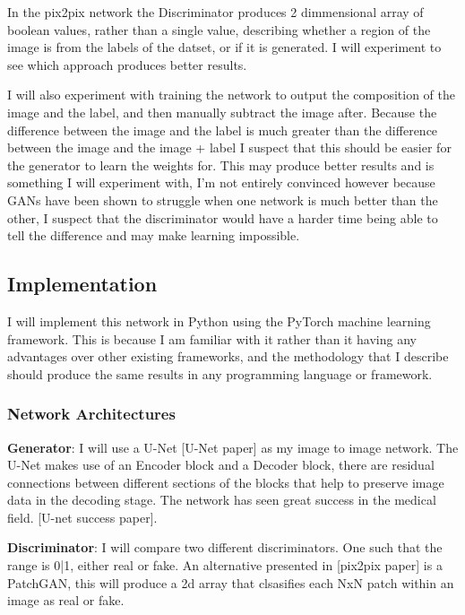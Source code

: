 \documentclass[11pt]{article}
\begin{document}
In the pix2pix network the Discriminator produces 2 dimmensional array of boolean values, rather than a single value, describing whether a region of the image is from the labels of the datset, or if it is generated. I will experiment to see which approach produces better results. 


I will also experiment with training the network to output the composition of the image and the label, and then manually subtract the image after. Because the difference between the image and the label is much greater than the difference between the image and the image + label I suspect that this should be easier for the generator to learn the weights for. This may produce better results and is something I will experiment with, I'm not entirely convinced however because GANs have been shown to struggle when one network is much better than the other, I suspect that the discriminator would have a harder time being able to tell the difference and may make learning impossible. 

\subsection{Implementation}

I will implement this network in Python using the PyTorch machine learning framework. This is because I am familiar with it rather than it having any advantages over other existing frameworks, and the methodology that I describe should produce the same results in any programming language or framework.

\subsubsection{Network Architectures}

\textbf{Generator}: I will use a U-Net [U-Net paper] as my image to image network. The U-Net makes use of an Encoder block and a Decoder block, there are residual connections between different sections of the blocks that help to preserve image data in the decoding stage. The network has seen great success in the medical field. [U-net success paper].

\textbf{Discriminator}: I will compare two different discriminators. One such that the range is {0|1}, either real or fake. An alternative presented in [pix2pix paper] is a PatchGAN, this will produce a 2d array that clsasifies each NxN patch within an image as real or fake.
\end{document}
